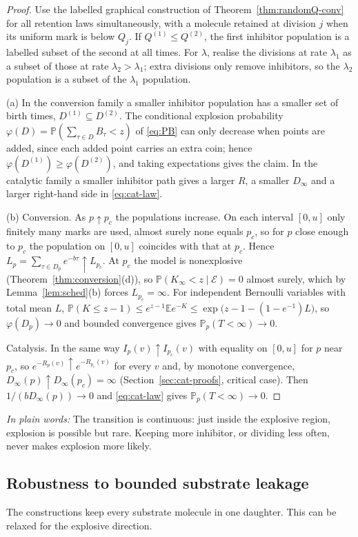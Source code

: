 \documentclass[11pt,a4paper]{article}
\numberwithin{equation}{section}
\theoremstyle{definition}\newtheorem{definition}[theorem]{Definition}
\theoremstyle{remark}\newtheorem{remark}[theorem]{Remark}\newtheorem{example}[theorem]{Example}
\newcommand{\E}{\mathbb E}
\renewcommand{\P}{\mathbb P}
\newcommand{\takeaway}[1]{\par\smallskip\noindent\textit{In plain words:} #1\par\smallskip}
\begin{document}
\begin{proof}
Use the labelled graphical construction of Theorem~\ref{thm:randomQ-conv} for all retention laws simultaneously, with a molecule retained at division $j$ when its uniform mark is below $Q_j$. If $Q^{(1)}\le Q^{(2)}$, the first inhibitor population is a labelled subset of the second at all times. For $\lambda$, realise the divisions at rate $\lambda_1$ as a subset of those at rate $\lambda_2>\lambda_1$; extra divisions only remove inhibitors, so the $\lambda_2$ population is a subset of the $\lambda_1$ population.

(a) In the conversion family a smaller inhibitor population has a smaller set of birth times, $D^{(1)}\subseteq D^{(2)}$. The conditional explosion probability $\varphi(D)=\P(\sum_{\tau\in D}B_\tau<z)$ of \eqref{eq:PB} can only decrease when points are added, since each added point carries an extra coin; hence $\varphi(D^{(1)})\ge\varphi(D^{(2)})$, and taking expectations gives the claim. In the catalytic family a smaller inhibitor path gives a larger $R$, a smaller $D_\infty$ and a larger right-hand side in \eqref{eq:cat-law}.

(b) Conversion. As $p\uparrow p_c$ the populations increase. On each interval $[0,u]$ only finitely many marks are used, almost surely none equals $p_c$, so for $p$ close enough to $p_c$ the population on $[0,u]$ coincides with that at $p_c$. Hence $L_p=\sum_{\tau\in D_p}e^{-b\tau}\uparrow L_{p_c}$. At $p_c$ the model is nonexplosive (Theorem~\ref{thm:conversion}(d)), so $\P(K_\infty<z\mid\mathcal E)=0$ almost surely, which by Lemma~\ref{lem:sched}(b) forces $L_{p_c}=\infty$. For independent Bernoulli variables with total mean $L$, $\P(K\le z-1)\le e^{z-1}\E e^{-K}\le\exp\bigl(z-1-(1-e^{-1})L\bigr)$, so $\varphi(D_p)\to0$ and bounded convergence gives $\P_p(T<\infty)\to0$.

Catalysis. In the same way $I_p(v)\uparrow I_{p_c}(v)$ with equality on $[0,u]$ for $p$ near $p_c$, so $e^{-R_p(v)}\uparrow e^{-R_{p_c}(v)}$ for every $v$ and, by monotone convergence, $D_\infty(p)\uparrow D_\infty(p_c)=\infty$ (Section~\ref{sec:cat-proofs}, critical case). Then $1/(bD_\infty(p))\to0$ and \eqref{eq:cat-law} gives $\P_p(T<\infty)\to0$.
\end{proof}

\takeaway{The transition is continuous: just inside the explosive region, explosion is possible but rare. Keeping more inhibitor, or dividing less often, never makes explosion more likely.}

\subsection{Robustness to bounded substrate leakage}
The constructions keep every substrate molecule in one daughter. This can be relaxed for the explosive direction.
\end{document}
